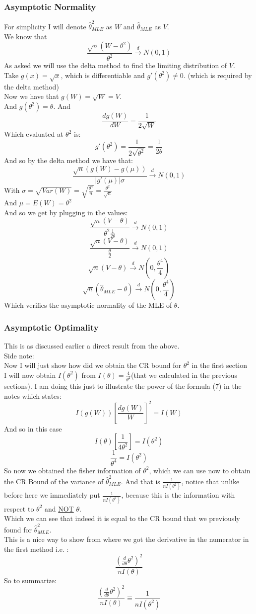 \documentclass[12pt]{article}
\begin{document}
\subsubsection*{Asymptotic Normality}
For simplicity I will denote $\hat{\theta}^2_{MLE}$ as $W$ and $\hat{\theta}_{MLE}$ as $V$.\\ 
We know that 
\[
\frac{\sqrt{n}(W-\theta^2)}{\theta^2} \xrightarrow{d} N(0,1)
\]
As asked we will use the delta method to find the limiting distribution of $V$.\\
Take $g(x) = \sqrt{x}$, which is differentiable and $g'(\theta^2) \neq 0$. (which is required by the delta method)\\
Now we have that $g(W) = \sqrt{W} = V$. \\
And $g(\theta^2) = \theta$. 
And 
\[
\frac{dg(W)}{dW} = \frac{1}{2\sqrt{W}}
\]
Which evaluated at $\theta^2$ is:
\[
g'(\theta^2) = \frac{1}{2\sqrt{\theta^2}} = \frac{1}{2\theta}
\]
And so by the delta method we have that: 
\[
\frac{\sqrt{n}(g(W)-g(\mu))}{|g'(\mu)|\sigma} \xrightarrow{d}N(0,1)
\]
With $\sigma = \sqrt{Var(W)} = \sqrt{\frac{\theta^4}{n}} = \frac{\theta^2}{\sqrt{n}}$\\
And $\mu = E(W) = \theta^2$\\
And so we get by plugging in the values: 
\[
\frac{\sqrt{n}(V-\theta)}{\theta^2\frac{1}{2\theta}} \xrightarrow{d} N(0,1)
\]
\[
  \frac{\sqrt{n}(V-\theta)}{\frac{\theta}{2}} \xrightarrow{d} N(0,1)
\]
\[
  \sqrt{n}(V-\theta) \xrightarrow{d} N(0,\frac{\theta^4}{4})
\]
\[
  \sqrt{n}(\hat{\theta}_{MLE}-\theta) \xrightarrow{d} N(0,\frac{\theta^4}{4})
\]
Which verifies the asymptotic normality of the MLE of $\theta$.
\subsubsection*{Asymptotic Optimality}
This is as discussed earlier a direct result from the above.\\
Side note: \\ 
Now I will just show how did we obtain the CR bound for $\theta^2$ in the first section \\
I will now obtain $I(\theta^2)$ from $I(\theta) = \frac{4}{\theta^2}$(that we calculated in the previous sections). I am doing this just to illustrate the power of the formula (7) in the notes which states:
\[
I(g(W))[\frac{dg(W)}{W}]^2 = I(W)
\]
And so in this case 
\[
I(\theta)[\frac{1}{4\theta^2}] = I(\theta^2)
\]
\[
\frac{1}{\theta^4} = I(\theta^2)
\]
So now we obtained the fisher information of $\theta^2$, which we can use now to obtain the CR Bound of the variance of $\hat{\theta}^2_{MLE}$. And that is $\frac{1}{nI(\theta^2)}$, notice that unlike before here we immediately put $\frac{1}{nI(\theta^2)}$, because this is the information with respect to $\theta^2$ and \underline{NOT} $\theta$.\\
Which we can see that indeed it is equal to the CR bound that we previously found for $\hat{\theta}^2_{MLE}$. \\ This is a nice way to show from where we got the derivative in the numerator in the first method i.e. : 
\[
  \frac{(\frac{d}{d\theta} \theta^2)^2}{n I(\theta)}
\]
So to summarize: 
\[
  \frac{(\frac{d}{d\theta} \theta^2)^2}{n I(\theta)} \equiv \frac{1}{nI(\theta^2)}
\]
\end{document}
